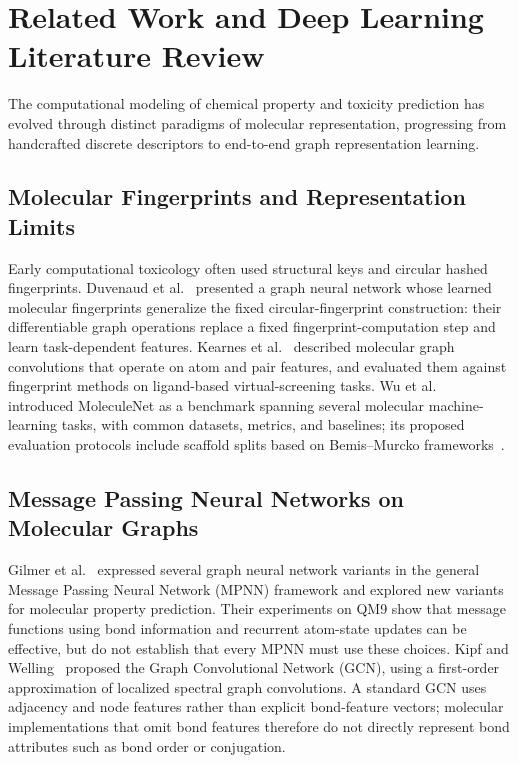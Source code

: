 \section{Related Work and Deep Learning Literature Review}
\label{sec:lit_review}

The computational modeling of chemical property and toxicity prediction has evolved through distinct paradigms of molecular representation, progressing from handcrafted discrete descriptors to end-to-end graph representation learning.

\subsection{Molecular Fingerprints and Representation Limits}
Early computational toxicology often used structural keys and circular hashed fingerprints. Duvenaud et al.~\cite{duvenaud2015convolutional} presented a graph neural network whose learned molecular fingerprints generalize the fixed circular-fingerprint construction: their differentiable graph operations replace a fixed fingerprint-computation step and learn task-dependent features. Kearnes et al.~\cite{kearnes2016molecular} described molecular graph convolutions that operate on atom and pair features, and evaluated them against fingerprint methods on ligand-based virtual-screening tasks. Wu et al.~\cite{wu2018moleculenet} introduced MoleculeNet as a benchmark spanning several molecular machine-learning tasks, with common datasets, metrics, and baselines; its proposed evaluation protocols include scaffold splits based on Bemis--Murcko frameworks~\cite{bemis1996properties}.

\subsection{Message Passing Neural Networks on Molecular Graphs}
Gilmer et al.~\cite{gilmer2017neural} expressed several graph neural network variants in the general Message Passing Neural Network (MPNN) framework and explored new variants for molecular property prediction. Their experiments on QM9 show that message functions using bond information and recurrent atom-state updates can be effective, but do not establish that every MPNN must use these choices. Kipf and Welling~\cite{kipf2017gcn} proposed the Graph Convolutional Network (GCN), using a first-order approximation of localized spectral graph convolutions. A standard GCN uses adjacency and node features rather than explicit bond-feature vectors; molecular implementations that omit bond features therefore do not directly represent bond attributes such as bond order or conjugation.

